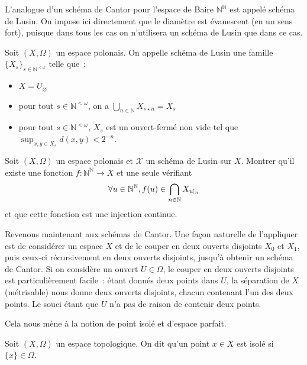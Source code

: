 L'analogue d'un schéma de Cantor pour l'espace de Baire $\mathbb N^\mathbb N$
est appelé schéma de Lusin. On impose ici directement que le diamètre est
évanescent (en un sens fort), puisque dans tous les cas on n'utilisera un schéma
de Lusin que dans ce cas.

\begin{definition}
  Soit $(X,\Omega)$ un espace polonais. On appelle schéma de Lusin une famille
  $\{X_s\}_{s\in \mathbb N^{<\omega}}$ telle que~:
  \begin{itemize}
  \item $X = U_{\varnothing}$
  \item pour tout $s\in \mathbb N^{<\omega}$, on a
    $\displaystyle \bigcup_{n\in\mathbb N} X_{s\star n} = X_s$
  \item pour tout $s\in\mathbb N^{<\omega}$, $X_s$ est un ouvert-fermé non vide
    tel que $\displaystyle\sup_{x,y\in X_s} d(x,y) < 2^{-n}$.
  \end{itemize}
\end{definition}

\begin{exercise}\label{exo.Lusin.inj}
  Soit $(X,\Omega)$ un espace polonais et $\mathcal X$ un schéma de Lusin sur
  $X$. Montrer qu'il existe une fonction $f : \mathbb N^\mathbb N \to X$
  et une seule vérifiant
  \[\forall u \in \mathbb N^\mathbb N, f(u) \in
  \bigcap_{n \in \mathbb N} X_{u\!\upharpoonright_{n}}\]
  et que cette fonction est une injection continue.
\end{exercise}

Revenons maintenant aux schémas de Cantor. Une façon naturelle de l'appliquer
est de considérer un espace $X$ et de le couper en deux ouverts disjoints
$X_0$ et $X_1$, puis ceux-ci récursivement en deux ouverts disjoints, jusqu'à
obtenir un schéma de Cantor. Si on considère un ouvert $U\in \Omega$, le
couper en deux ouverts disjoints est particulièrement facile~: étant donnés deux
points dans $U$, la séparation de $X$ (métrisable) nous donne deux ouverts
disjoints, chacun contenant l'un des deux points. Le souci étant que $U$ n'a pas
de raison de contenir deux points.

Cela nous mène à la notion de point isolé et d'espace parfait.

\begin{definition}
  Soit $(X,\Omega)$ un espace topologique. On dit qu'un point $x\in X$ est isolé
  si $\{x\}\in\Omega$.
\end{definition}


